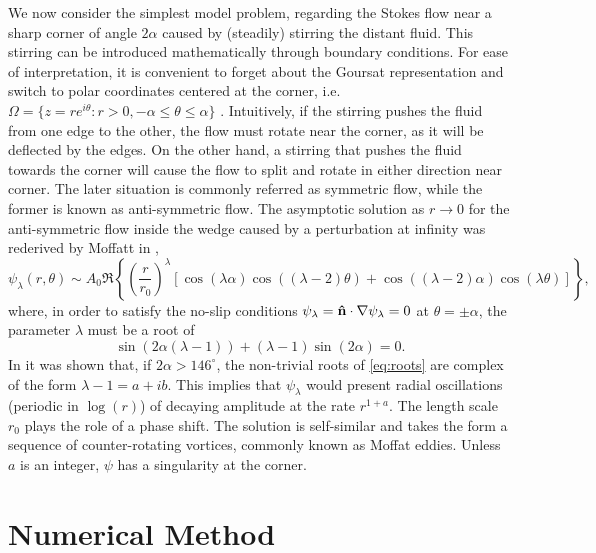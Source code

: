 \documentclass{article}
\begin{document}
We now consider the simplest model problem, regarding the Stokes flow near a
sharp corner of angle $2\alpha$ caused by (steadily) stirring the distant
fluid. This stirring can be introduced mathematically through boundary
conditions. For ease of interpretation, it is convenient to forget about the
Goursat representation and switch to polar coordinates centered at the corner,
i.e. $\Omega = \{z = re^{i\theta} : r > 0, -\alpha \leq \theta \leq \alpha \}$
. Intuitively, if the stirring pushes the fluid from one edge to the other, the
flow must rotate near the corner, as it will be deflected by the edges. On the
other hand, a stirring that pushes the fluid towards the corner will cause the
flow to split and rotate in either direction near corner. The later situation
is commonly referred as symmetric flow, while the former is known as
anti-symmetric flow. The asymptotic solution as $r\to 0$ for the anti-symmetric
flow inside the wedge caused by a perturbation at infinity was rederived by
Moffatt in \cite{moffatt64},
\begin{equation}\label{eq:antisym}
\psi_\lambda(r,\theta) \sim A_0\Re\left\{\left(\frac{r}{r_0}\right)^\lambda 
   \left[\cos{(\lambda\alpha)}\cos{\left((\lambda-2)\theta\right)} +
   \cos{\left((\lambda-2)\alpha\right)}\cos{(\lambda\theta)}\right]\right\},
\end{equation}
where, in order to satisfy the no-slip conditions
$\psi_\lambda=\mathbf{\hat{n}}\cdot\nabla\psi_\lambda=0$ at $\theta=\pm\alpha$, the
parameter $\lambda$ must be a root of
\begin{equation}\label{eq:roots}
\sin{\left(2\alpha(\lambda-1)\right)} + (\lambda-1)\sin{(2\alpha)}=0.
\end{equation}
In \cite{dean49} it was shown that, if $2\alpha>146^\circ$, the non-trivial
roots of \eqref{eq:roots} are complex of the form $\lambda-1=a + ib$. This
implies that $\psi_\lambda$ would present radial oscillations (periodic in
$\log(r)$) of decaying amplitude at the rate  $r^{1+a}$. The length scale $r_0$
plays the role of a phase shift. The solution is self-similar and takes the
form a sequence of counter-rotating vortices, commonly known as Moffat eddies.
Unless $a$ is an integer, $\psi$ has a singularity at the corner.

\section{Numerical Method \label{sec:method}}
\end{document}
